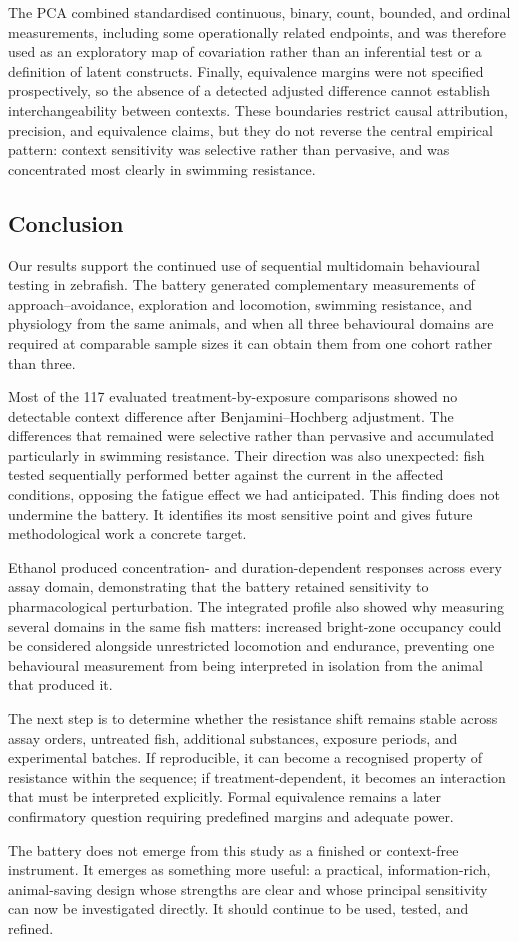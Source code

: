 \documentclass[12pt,a4paper]{article}
\begin{document}
The PCA combined standardised continuous, binary, count, bounded, and ordinal measurements, including some operationally related endpoints, and was therefore used as an exploratory map of covariation rather than an inferential test or a definition of latent constructs. Finally, equivalence margins were not specified prospectively, so the absence of a detected adjusted difference cannot establish interchangeability between contexts. These boundaries restrict causal attribution, precision, and equivalence claims, but they do not reverse the central empirical pattern: context sensitivity was selective rather than pervasive, and was concentrated most clearly in swimming resistance.

\subsection{Conclusion}

Our results support the continued use of sequential multidomain behavioural testing in zebrafish. The battery generated complementary measurements of approach--avoidance, exploration and locomotion, swimming resistance, and physiology from the same animals, and when all three behavioural domains are required at comparable sample sizes it can obtain them from one cohort rather than three.

Most of the 117 evaluated treatment-by-exposure comparisons showed no detectable context difference after Benjamini--Hochberg adjustment. The differences that remained were selective rather than pervasive and accumulated particularly in swimming resistance. Their direction was also unexpected: fish tested sequentially performed better against the current in the affected conditions, opposing the fatigue effect we had anticipated. This finding does not undermine the battery. It identifies its most sensitive point and gives future methodological work a concrete target.

Ethanol produced concentration- and duration-dependent responses across every assay domain, demonstrating that the battery retained sensitivity to pharmacological perturbation. The integrated profile also showed why measuring several domains in the same fish matters: increased bright-zone occupancy could be considered alongside unrestricted locomotion and endurance, preventing one behavioural measurement from being interpreted in isolation from the animal that produced it.

The next step is to determine whether the resistance shift remains stable across assay orders, untreated fish, additional substances, exposure periods, and experimental batches. If reproducible, it can become a recognised property of resistance within the sequence; if treatment-dependent, it becomes an interaction that must be interpreted explicitly. Formal equivalence remains a later confirmatory question requiring predefined margins and adequate power.

The battery does not emerge from this study as a finished or context-free instrument. It emerges as something more useful: a practical, information-rich, animal-saving design whose strengths are clear and whose principal sensitivity can now be investigated directly. It should continue to be used, tested, and refined.
\end{document}
